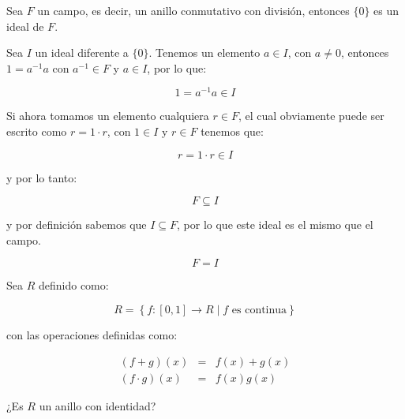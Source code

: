         \begin{ejemplo}
            Sea $F$ un campo, es decir, un anillo conmutativo con división, entonces $\{0\}$ es un ideal de $F$.

            Sea $I$ un ideal diferente a $\{0\}$.
            Tenemos un elemento $a \in I$, con $a \ne 0$, entonces $1 = a^{-1} a$ con $a^{-1} \in F$ y $a \in I$, por lo que:

            \begin{equation*}
                1 = a^{-1} a \in I
            \end{equation*}

            Si ahora tomamos un elemento cualquiera $r \in F$, el cual obviamente puede ser escrito como $r = 1 \cdot r$, con $1 \in I$ y $r \in F$ tenemos que:

            \begin{equation*}
                r = 1 \cdot r \in I
            \end{equation*}

            y por lo tanto:

            \begin{equation*}
                F \subseteq I
            \end{equation*}

            y por definición sabemos que $I \subseteq F$, por lo que este ideal es el mismo que el campo.

            \begin{equation*}
                F = I
            \end{equation*}
        \end{ejemplo}

        \begin{ejercicio}
            Sea $R$ definido como:

            \begin{equation*}
                R = \left\{ f \colon [0, 1] \to R \mid f \text{ es continua} \right\}
            \end{equation*}

            con las operaciones definidas como:

            \begin{eqnarray*}
                (f + g)(x) & = & f(x) + g(x) \\
                (f \cdot g)(x) & = & f(x) g(x) 
            \end{eqnarray*}

            ¿Es $R$ un anillo con identidad?
        \end{ejercicio}

